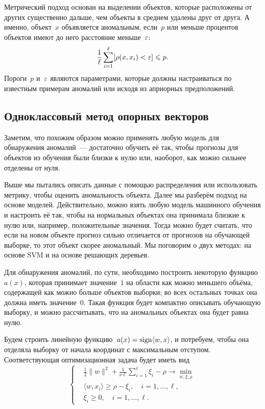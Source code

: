\documentclass[12pt,fleqn]{article}
\begin{document}
Метрический подход основан на выделении объектов, которые расположены от других
существенно дальше, чем объекты в среднем удалены друг от друга.
А именно, объект~$x$ объявляется аномальным, если~$p$ или меньше процентов объектов
имеют до него расстояние меньше~$\varepsilon$:
\[
    \frac{1}{\ell}
    \sum_{i = 1}^{\ell}
        [\rho(x, x_i) < \varepsilon]
    \leqslant
    p.
\]
Пороги~$p$ и~$\varepsilon$ являются параметрами, которые должны настраиваться
по известным примерам аномалий или исходя из априорных предположений.

\subsection{Одноклассовый метод опорных векторов}

Заметим, что похожим образом можно применять любую модель для обнаружения аномалий~---
достаточно обучить её так, чтобы прогнозы для объектов из обучения были близки к нулю
или, наоборот, как можно сильнее отделены от нуля.

Выше мы пытались описать данные с помощью распределения или использовать метрику, чтобы оценить аномальность объекта.
Далее мы разберём подход на основе моделей.
Действительно, можно взять любую модель машинного обучения и настроить её так,
чтобы на нормальных объектах она принимала близкие к нулю или, например, положительные значения.
Тогда можно будет считать, что если на новом объекте прогноз сильно отличается от прогнозов на обучающей выборке,
то этот объект скорее аномальный.
Мы поговорим о двух методах: на основе SVM и на основе решающих деревьев.

Для обнаружения аномалий, по сути, необходимо построить некоторую функцию~$a(x)$,
которая принимает значение~$1$ на области как можно меньшего объёма,
содержащей как можно больше объектов выборки; во всех остальных точках она
должна иметь значение~$0$.
Такая функция будет компактно описывать обучающую выборку,
и можно рассчитывать, что на аномальных объектах она будет равна нулю.

Будем строить линейную функцию~$a(x) = \mathop{\rm sign}\limits \langle w, x \rangle$, и потребуем,
чтобы она отделяла выборку от начала координат с максимальным отступом.
Соответствующая оптимизационная задача будет иметь вид~\cite{scholkopf99oneclass}
\[
    \left\{
        \begin{aligned}
            & \frac{1}{2} \|w\|^2
            +
            \frac{1}{\nu \ell} \sum_{i = 1}^{\ell} \xi_i
            -
            \rho
            \to \min_{w, \xi, \rho} \\
            & \langle w, x_i \rangle
            \geq
            \rho - \xi_i,
            \quad i = 1, \dots, \ell, \\
            & \xi_i \geq 0, \quad i = 1, \dots, \ell.
        \end{aligned}
    \right.
\]
\end{document}
